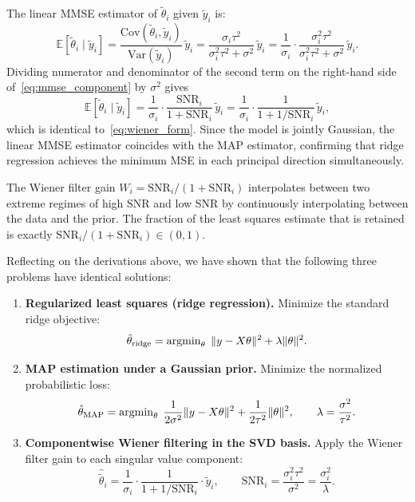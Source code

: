 The linear MMSE estimator of $\tilde\theta_i$ given $\tilde y_i$ is:
\begin{equation}
  \label{eq:mmse_component}
  \mathbb{E}[\tilde\theta_i \mid \tilde y_i]
  = \frac{\mathrm{Cov}(\tilde\theta_i,\tilde y_i)}{\mathrm{Var}(\tilde y_i)}
    \,\tilde y_i
  = \frac{\sigma_i\tau^2}{\sigma_i^2\tau^2 + \sigma^2}
    \,\tilde y_i
  = \frac{1}{\sigma_i}\cdot
    \frac{\sigma_i^2\tau^2}{\sigma_i^2\tau^2 + \sigma^2}
    \,\tilde y_i.
\end{equation}
Dividing numerator and denominator of the second term on the right-hand side of~\eqref{eq:mmse_component} by $\sigma^2$ gives
\begin{equation}
  \label{eq:mmse_snr}
  \mathbb{E}[\tilde\theta_i \mid \tilde y_i]
  = \frac{1}{\sigma_i}\cdot\frac{\mathrm{SNR}_i}{1 + \mathrm{SNR}_i}
    \,\tilde y_i
  = \frac{1}{\sigma_i}\cdot\frac{1}{1 + 1/\mathrm{SNR}_i}
    \,\tilde y_i,
\end{equation}
which is identical to~\eqref{eq:wiener_form}.  Since the model is jointly
Gaussian, the linear MMSE estimator coincides with the MAP estimator, confirming that
ridge regression achieves the minimum MSE in each principal direction
simultaneously.

\medskip

The Wiener filter gain $W_i = \mathrm{SNR}_i/(1+\mathrm{SNR}_i)$ interpolates
between two extreme regimes of high SNR and low SNR by continuously interpolating between the data and the prior. The fraction of the least squares estimate that is retained is exactly $\mathrm{SNR}_i/(1 + \mathrm{SNR}_i) \in (0,1)$.

\bigskip
Reflecting on the derivations above, we have shown that the following three problems have identical solutions:
\begin{enumerate}

  \item \textbf{Regularized least squares (ridge regression).}
  Minimize the standard ridge objective:
  \[
    \hat\theta_{\mathrm{ridge}}
    = \operatorname{argmin}_\theta\; \|y - X\theta\|^2 + \lambda\|\theta\|^2.
  \]

  \item \textbf{MAP estimation under a Gaussian prior.}
  Minimize the normalized probabilistic loss:
  \[
    \hat\theta_{\mathrm{MAP}}
    = \operatorname{argmin}_\theta\;
      \frac{1}{2\sigma^2}\|y - X\theta\|^2 + \frac{1}{2\tau^2}\|\theta\|^2,
    \qquad \lambda = \frac{\sigma^2}{\tau^2}.
  \]

  \item \textbf{Componentwise Wiener filtering in the SVD basis.}
  Apply the Wiener filter gain to each singular value component:
  \[
    \hat{\tilde\theta}_i
    = \frac{1}{\sigma_i}\cdot\frac{1}{1 + 1/\mathrm{SNR}_i}\cdot\tilde y_i,
    \qquad
    \mathrm{SNR}_i = \frac{\sigma_i^2\tau^2}{\sigma^2} = \frac{\sigma_i^2}{\lambda}.
  \]

\end{enumerate}






